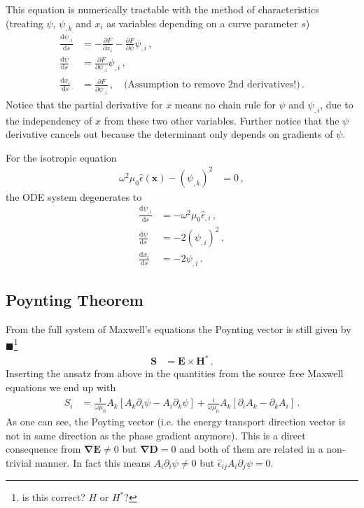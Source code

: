 \documentclass[12pt,a4paper,twoside,openright,BCOR10mm,headsepline,titlepage,abstracton,chapterprefix,final]{scrreprt}
\newcommand\Vector[1]{{\mathbf{#1}}}
\newcommand\Tensor[1]{\hat{#1}}
\newcommand\permittivity{\Tensor{\epsilon}}
\newcommand{\remark}[1]{{\color{red}$\blacksquare$}\footnote{{\color{red}#1}}}
\begin{document}
This equation is numerically tractable with the method of characteristics (treating $\psi$, $\psi_{,k}$ and $x_i$ as variables depending on a curve parameter $s$)
\begin{align}
 \frac{\text{d}\psi_{,i}}{\text{d}s} &= -\frac{\partial F}{\partial x_i} - \frac{\partial F}{\partial \psi} \psi_{,i}\,,\\
 \frac{\text{d}\psi}{\text{d}s} &= \frac{\partial F}{\partial \psi_{,i}} \psi_{,i}\,,\\
 \frac{\text{d}x_i}{\text{d}s} &= \frac{\partial F}{\partial \psi_{,i}}\,,\quad \text{(Assumption to remove 2nd derivatives!)}\,. 
\end{align}
Notice that the partial derivative for $x$ means no chain rule for $\psi$ and $\psi_{,i}$, due to the independency of $x$ from these two other variables.
Further notice that the $\psi$ derivative cancels out because the determinant only depends on gradients of $\psi$.

For the isotropic equation
\begin{align}
 \omega^2 \mu_0 \permittivity(\Vector{x}) - (\psi_{,k})^2&= 0\,,
\end{align}
the ODE system degenerates to
\begin{align}
 \frac{\text{d}\psi_{,i}}{\text{d}s} &= -\omega^2 \mu_0 \permittivity_{,i}\,,\\
 \frac{\text{d}\psi}{\text{d}s} &= -2 (\psi_{,i})^2\,,\\
 \frac{\text{d}x_i}{\text{d}s} &= -2 \psi_{,i}\,. 
\end{align}


\subsection{Poynting Theorem}
From the full system of Maxwell's equations the Poynting vector is still given by\remark{is this correct? $H$ or $H^\ast$?}
\begin{align}
 \Vector{S} &= \Vector{E} \times \Vector{H}^\ast\,.
\end{align}
Inserting the ansatz from above in the quantities from the source free Maxwell equations we end up with
\begin{align}
 S_i &= \frac{1}{\omega \mu_0} A_k [A_k \partial_i \psi - A_i \partial_k \psi] + \frac{i}{\omega \mu_0} A_k [\partial_i A_k - \partial_k A_i]\,.
\end{align}
As one can see, the Poyting vector (i.e. the energy transport direction vector is not in same direction as the phase gradient anymore).
This is a direct consequence from $\Vector{\nabla} \Vector{E} \ne 0$ but $\Vector{\nabla} \Vector{D} = 0$ and both of them are related in a non-trivial manner.
In fact this means $A_i \partial_i \psi \ne 0$ but $\permittivity_{ij} A_i \partial_j \psi = 0$.
\end{document}
